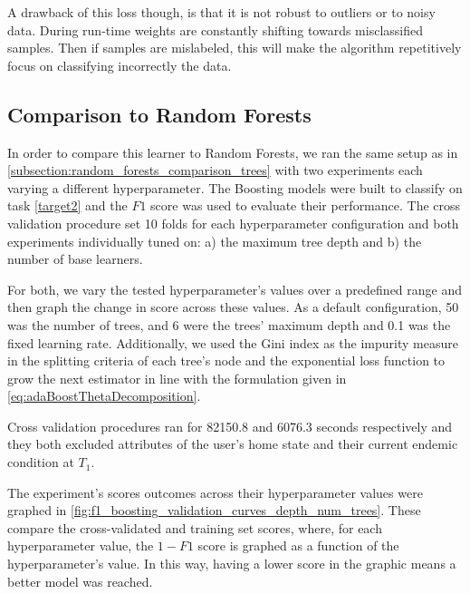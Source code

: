 A drawback of this loss though, is that it is not robust to outliers or to noisy data. During run-time weights are constantly shifting towards misclassified samples. Then if samples are mislabeled, this will make the algorithm repetitively focus on classifying incorrectly the data.


\subsection{ Comparison to Random Forests}\label{subsection:boosting_comparison_forest}

In order to compare this learner to Random Forests, we ran the same setup as in \cref{subsection:random_forests_comparison_trees}
with two experiments each varying a different hyperparameter.
The Boosting models were built to classify on task \cref{target2} and the $F1$ score was used to evaluate their performance.
The cross validation procedure set 10 folds for each hyperparameter
 configuration and both experiments individually tuned on: a) the maximum tree depth and b) the number of base learners.

For both, we vary the tested hyperparameter's values over a predefined range and then graph the change in score across these values.
As a default configuration, 50 was the number of trees, and 6 were the trees' maximum depth and 0.1 was the fixed learning rate.
Additionally, we used the Gini index as the impurity measure in the splitting criteria of each tree's node and the exponential loss function to grow the next estimator in line with the formulation given in \cref{eq:adaBoostThetaDecomposition}.

Cross validation procedures ran for 82150.8
 and 6076.3 seconds respectively and they both excluded attributes of the user's home state and their current endemic condition at $T_1$.

The experiment's scores outcomes across their hyperparameter values were graphed in \cref{fig:f1_boosting_validation_curves_depth_num_trees}.
These compare the cross-validated and training set scores, where, for each hyperparameter value, the $1-F1$ score is graphed as a function of the hyperparameter's value.
In this way, having a lower score in the graphic means a better model was reached.



